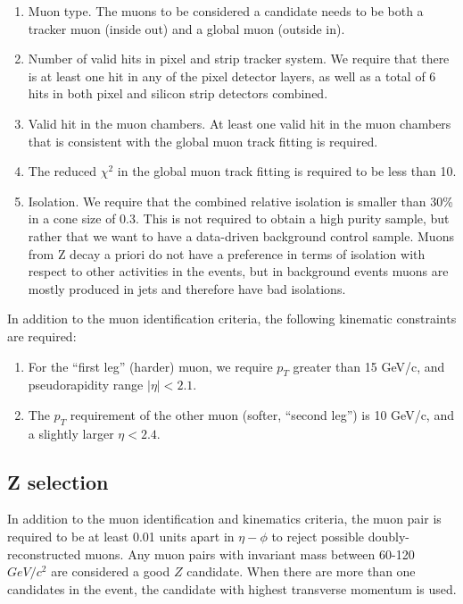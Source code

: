 \documentclass{cmspaper}
\begin{document}
\begin{enumerate}
\item Muon type.  The muons to be considered a candidate needs to be
  both a tracker muon (inside out) and a global muon (outside in).
\item Number of valid hits in pixel and strip tracker system.  We
  require that there is at least one hit in any of the pixel detector
  layers, as well as a total of 6 hits in both pixel and silicon strip
  detectors combined.
\item Valid hit in the muon chambers.  At least one valid hit in the
  muon chambers that is consistent with the global muon track fitting
  is required.
\item The reduced $\chi^2$ in the global muon track fitting is
  required to be less than 10.
\item Isolation.  We require that the combined relative isolation is
  smaller than 30\% in a cone size of 0.3.  This is not required to
  obtain a high purity sample, but rather that we want to have a
  data-driven background control sample.  Muons from Z decay a priori
  do not have a preference in terms of isolation with respect to other
  activities in the events, but in background events muons are mostly
  produced in jets and therefore have bad isolations.
\end{enumerate}

In addition to the muon identification criteria, the following
kinematic constraints are required:

\begin{enumerate}
\item For the ``first leg'' (harder) muon, we require $p_T$ greater
  than 15 GeV/c, and pseudorapidity range $|\eta|<2.1$.
\item The $p_T$ requirement of the other muon (softer, ``second leg'')
  is 10 GeV/c, and a slightly larger $\eta<2.4$.
\end{enumerate}

\subsection{Z selection}

In addition to the muon identification and kinematics criteria, the
muon pair is required to be at least 0.01 units apart in $\eta-\phi$
to reject possible doubly-reconstructed muons. Any muon pairs with
invariant mass between 60-120 $GeV/c^2$ are considered a good $Z$
candidate.  When there are more than one candidates in the event, the
candidate with highest transverse momentum is used.
\end{document}
